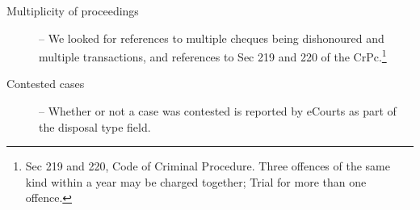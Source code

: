 \documentclass[10pt,aspectratio=169]{beamer}
\begin{document}
\begin{frame}[allowframebreaks]
\begin{description}
  \item [Multiplicity of proceedings] -- We looked for references to multiple cheques being dishonoured and multiple transactions, and references to Sec 219 and 220 of the CrPc.\footnote{Sec 219 and 220, Code of Criminal Procedure. Three offences of the same kind within a year may be charged together; Trial for more than one offence.}
  \item [Contested cases] -- Whether or not a case was contested is reported by eCourts as part of the disposal type field.
  \end{description}
\end{frame}
\end{document}
